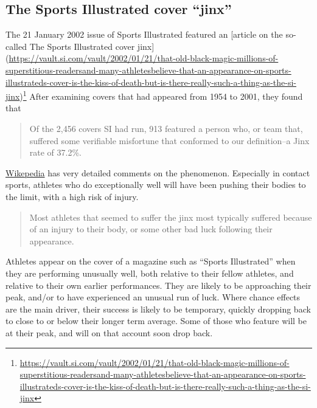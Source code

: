 \documentclass[
  10pt,
  b5paper]{book}
\begin{document}
\hypertarget{the-sports-illustrated-cover-jinx}{%
\subsection*{The Sports Illustrated cover ``jinx''}\label{the-sports-illustrated-cover-jinx}}

The 21 January 2002 issue of Sports Illustrated featured an
{[}article on the so-called The Sports Illustrated cover jinx{]}
(\url{https://vault.si.com/vault/2002/01/21/that-old-black-magic-millions-of-superstitious-readersand-many-athletesbelieve-that-an-appearance-on-sports-illustrateds-cover-is-the-kiss-of-death-but-is-there-really-such-a-thing-as-the-si-jinx})\footnote{\url{https://vault.si.com/vault/2002/01/21/that-old-black-magic-millions-of-superstitious-readersand-many-athletesbelieve-that-an-appearance-on-sports-illustrateds-cover-is-the-kiss-of-death-but-is-there-really-such-a-thing-as-the-si-jinx}}
After examining covers that had appeared from 1954 to 2001, they found that

\begin{quote}
Of the 2,456 covers SI had run, 913 featured a person who, or team that,
suffered some verifiable misfortune that conformed to our definition--a Jinx
rate of 37.2\%.
\end{quote}

\href{https://en.wikipedia.org/wiki/Sports_Illustrated_cover_jinx}{Wikepedia}
has very detailed comments on the phenomenon. Especially in contact sports,
athletes who do exceptionally well will have been pushing their bodies to the
limit, with a high risk of injury.

\begin{quote}
Most athletes that seemed to suffer the jinx most typically
suffered because of an injury to their body, or some other bad
luck following their appearance.
\end{quote}

Athletes appear on the cover of a magazine such as ``Sports Illustrated''
when they are performing unusually well, both relative to their fellow
athletes, and relative to their own earlier performances. They are
likely to be approaching their peak, and/or to have experienced an
unusual run of luck. Where chance effects are the main driver,
their success is likely to be temporary, quickly dropping back to close
to or below their longer term average. Some of those who feature will
be at their peak, and will on that account soon drop back.
\end{document}
